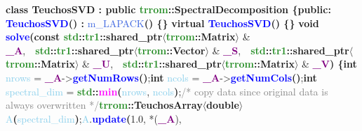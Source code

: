         \newline\textbf{class \textcolor{Melon}{TeuchosSVD} : public \textcolor{ForestGreen}{trrom}::\textcolor{Melon}{SpectralDecomposition} \{}\newline\textbf{public:}\newline
        \tab\textbf{\textcolor{blue}{TeuchosSVD}() : }\textcolor{RoyalBlue}{m\_LAPACK}\textbf{() \{\}}\newline
        \tab\textbf{virtual \textcolor{blue}{\detokenize{~}TeuchosSVD}() \{\}}\newline\newline
        \tab\textbf{\textcolor{BrickRed}{void} \textcolor{blue}{solve}(const \textcolor{ForestGreen}{std}::\textcolor{ForestGreen}{tr1}::\textcolor{Melon}{shared\_ptr}$\langle$\textcolor{ForestGreen}{trrom}::\textcolor{Melon}{Matrix}$\rangle$} \& \textbf{\textcolor{Purple}{\_A}},\newline\tab\tab\tab\ \ \textbf{\textcolor{ForestGreen}{std}::\textcolor{ForestGreen}{tr1}::\textcolor{Melon}{shared\_ptr}$\langle$\textcolor{ForestGreen}{trrom}::\textcolor{Melon}{Vector}$\rangle$} \& \textbf{\textcolor{Purple}{\_S}},\newline\tab\tab\tab\ \ \textbf{\textcolor{ForestGreen}{std}::\textcolor{ForestGreen}{tr1}::\textcolor{Melon}{shared\_ptr}$\langle$\textcolor{ForestGreen}{trrom}::\textcolor{Melon}{Matrix}$\rangle$} \& \textbf{\textcolor{Purple}{\_U}},\newline\tab\tab\tab\ \ \textbf{\textcolor{ForestGreen}{std}::\textcolor{ForestGreen}{tr1}::\textcolor{Melon}{shared\_ptr}$\langle$\textcolor{ForestGreen}{trrom}::\textcolor{Melon}{Matrix}$\rangle$} \& \textbf{\textcolor{Purple}{\_V}) \{}\newline\tab\tab\textbf{\textcolor{BrickRed}{int}} \textcolor{SkyBlue}{nrows} = \textbf{\textcolor{Purple}{\_A}}-\textgreater\textbf{\textcolor{blue}{getNumRows}()};\newline\tab\tab\textbf{\textcolor{BrickRed}{int}} \textcolor{SkyBlue}{ncols} = \textbf{\textcolor{Purple}{\_A}}-\textgreater\textbf{\textcolor{blue}{getNumCols}()};\newline\tab\tab\textbf{\textcolor{BrickRed}{int}} \textcolor{SkyBlue}{spectral\_dim} = \textbf{\textcolor{ForestGreen}{std}::\textcolor{magenta}{min}(}\textcolor{SkyBlue}{nrows}, \textcolor{SkyBlue}{ncols}\textbf{)};\newline\newline\tab\tab\textcolor{gray}{/* copy data since original data is always overwritten */}\newline\tab\tab\textbf{\textcolor{ForestGreen}{trrom}::\textcolor{Melon}{TeuchosArray}$\langle$\textcolor{BrickRed}{double}$\rangle$} \textcolor{SkyBlue}{A}\textbf{(}\textcolor{SkyBlue}{spectral\_dim}\textbf{)};\newline\tab\tab\textcolor{SkyBlue}{A}.\textbf{\textcolor{blue}{update}(}1.0, *(\textbf{\textcolor{Purple}{\_A}}), 